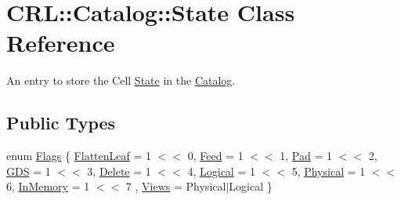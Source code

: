 \hypertarget{classCRL_1_1Catalog_1_1State}{}\section{C\+RL\+:\+:Catalog\+:\+:State Class Reference}
\label{classCRL_1_1Catalog_1_1State}


An entry to store the Cell \hyperlink{classCRL_1_1Catalog_1_1State}{State} in the \hyperlink{classCRL_1_1Catalog}{Catalog}.  


\subsection*{Public Types}
\begin{DoxyCompactItemize}
\item 
enum \hyperlink{classCRL_1_1Catalog_1_1State_a625003526d38ac7500b4ad7de35e2d74}{Flags} \{ \newline
\hyperlink{classCRL_1_1Catalog_1_1State_a625003526d38ac7500b4ad7de35e2d74a496651784f48e1dc9690ff484f90477c}{Flatten\+Leaf} = 1 $<$$<$ 0, 
\newline
\hyperlink{classCRL_1_1Catalog_1_1State_a625003526d38ac7500b4ad7de35e2d74a2b7599c1303429830c8d3e6b673b3cb1}{Feed} = 1 $<$$<$ 1, 
\newline
\hyperlink{classCRL_1_1Catalog_1_1State_a625003526d38ac7500b4ad7de35e2d74a2e2b8b775bb6e8d8d12500426a01e38b}{Pad} = 1 $<$$<$ 2, 
\newline
\hyperlink{classCRL_1_1Catalog_1_1State_a625003526d38ac7500b4ad7de35e2d74a98da2efe9c180f68f009836d1179cc4a}{G\+DS} = 1 $<$$<$ 3, 
\newline
\hyperlink{classCRL_1_1Catalog_1_1State_a625003526d38ac7500b4ad7de35e2d74ae8f1bee3750e1fa0c1d8097a28ee49da}{Delete} = 1 $<$$<$ 4, 
\newline
\hyperlink{classCRL_1_1Catalog_1_1State_a625003526d38ac7500b4ad7de35e2d74a39170df01b13e1845db6eef82cc41b33}{Logical} = 1 $<$$<$ 5, 
\newline
\hyperlink{classCRL_1_1Catalog_1_1State_a625003526d38ac7500b4ad7de35e2d74ae166fbe3aa47f42ea93b2624b2ffed7d}{Physical} = 1 $<$$<$ 6, 
\newline
\hyperlink{classCRL_1_1Catalog_1_1State_a625003526d38ac7500b4ad7de35e2d74a1f8f15ecd43109bcc463970d8acc03fd}{In\+Memory} = 1 $<$$<$ 7
, \newline
\hyperlink{classCRL_1_1Catalog_1_1State_a625003526d38ac7500b4ad7de35e2d74a6b88bbc27f9989a35a1e00772e157b35}{Views} = Physical$\vert$\+Logical
 \}
\end{DoxyCompactItemize}
